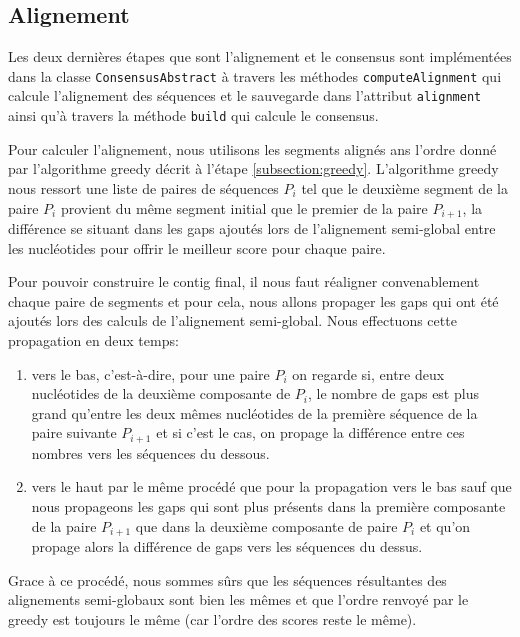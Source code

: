 	
\subsection{Alignement}
\label{subsection:alignment}
Les deux dernières étapes que sont l'alignement et le consensus sont 
implémentées dans la classe \verb|ConsensusAbstract| à travers les méthodes 
\verb|computeAlignment| qui calcule l'alignement des séquences et le sauvegarde 
dans l'attribut \verb|alignment| ainsi qu'à travers la méthode \verb|build| 
qui calcule le consensus.

Pour calculer l'alignement, nous utilisons les segments alignés ans l'ordre 
donné par l'algorithme greedy décrit à l'étape \ref{subsection:greedy}.
L'algorithme greedy nous ressort une liste de paires de séquences $P_{i}$ tel
que le deuxième segment de la paire $P_{i}$ provient du même segment initial que
le premier de la paire $P_{i + 1}$, la différence se situant dans les gaps
ajoutés lors de l'alignement semi-global entre les nucléotides pour offrir le
meilleur score pour chaque paire.

Pour pouvoir construire le contig final, il nous faut réaligner convenablement
chaque paire de segments et pour cela, nous allons propager les gaps qui ont été
ajoutés lors des calculs de l'alignement semi-global. Nous effectuons cette
propagation en deux temps:

\begin{enumerate}
	\item vers le bas, c'est-à-dire, pour une paire $P_{i}$ on regarde si, entre
		deux nucléotides de la deuxième composante de $P_{i}$, le
		nombre de gaps est plus grand qu'entre les deux mêmes nucléotides de la première
		séquence de la paire suivante $P_{i + 1}$ et si c'est le cas, on propage la
		différence entre ces nombres vers les séquences du dessous.
	\item vers le haut par le même procédé que pour la propagation vers le bas
		sauf que nous propageons les gaps qui sont plus présents dans la
		première composante de la paire $P_{i + 1}$ que dans la deuxième
		composante de paire $P_{i}$ et qu'on propage alors la différence de gaps
		vers les séquences du dessus.
\end{enumerate}

Grace à ce procédé, nous sommes sûrs que les séquences résultantes des
alignements semi-globaux sont bien les mêmes et que l'ordre renvoyé par le greedy
est toujours le même (car l'ordre des scores reste le même).

